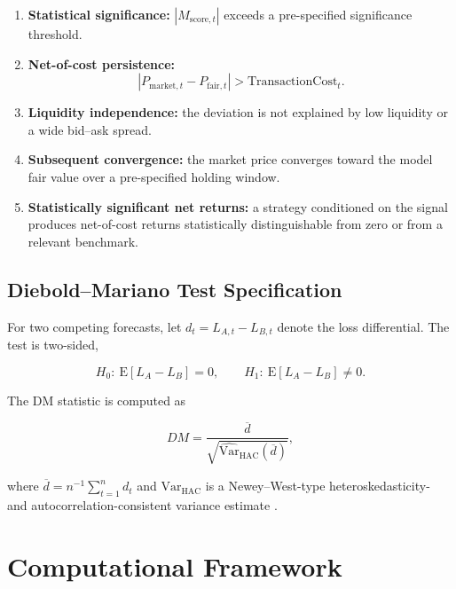 \documentclass[journal]{IEEEtran}
\begin{document}
\begin{enumerate}
  \item \textbf{Statistical significance:} $|M_{\mathrm{score},t}|$
    exceeds a pre-specified significance threshold.
  \item \textbf{Net-of-cost persistence:}
    \begin{equation}
    \label{eq:cost_persistence}
    |P_{\mathrm{market},t}-P_{\mathrm{fair},t}|
    > \mathrm{TransactionCost}_t.
    \end{equation}
  \item \textbf{Liquidity independence:} the deviation is not explained
    by low liquidity or a wide bid--ask spread.
  \item \textbf{Subsequent convergence:} the market price converges
    toward the model fair value over a pre-specified holding window.
  \item \textbf{Statistically significant net returns:} a strategy
    conditioned on the signal produces net-of-cost returns
    statistically distinguishable from zero or from a relevant
    benchmark.
\end{enumerate}

\subsection{Diebold--Mariano Test Specification}

For two competing forecasts, let $d_t=L_{A,t}-L_{B,t}$ denote the
loss differential. The test is two-sided,

\begin{equation}
H_0:\ \mathrm{E}[L_A-L_B]=0,\qquad
H_1:\ \mathrm{E}[L_A-L_B]\neq0.
\end{equation}

The DM statistic is computed as

\begin{equation}
DM = \frac{\overline{d}}
{\sqrt{\widehat{\mathrm{Var}}_{\mathrm{HAC}}(\overline{d})}},
\end{equation}

where $\overline{d}=n^{-1}\sum_{t=1}^{n}d_t$ and
$\widehat{\mathrm{Var}}_{\mathrm{HAC}}$ is a Newey--West-type
heteroskedasticity- and autocorrelation-consistent variance estimate
\cite{das2022}.

\section{Computational Framework}
\end{document}
